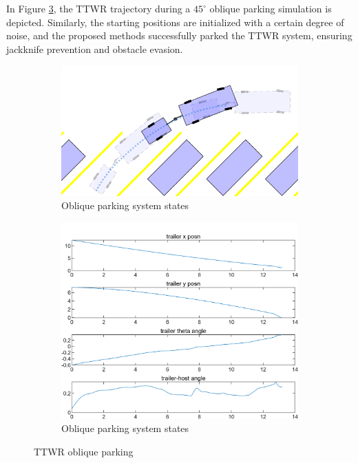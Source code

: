 In Figure \ref{fig:oblique parking}, the TTWR trajectory during a $45^{\circ}$ oblique parking simulation is depicted. Similarly, the starting positions are initialized with a certain degree of noise, and the proposed methods successfully parked the TTWR system, ensuring jackknife prevention and obstacle evasion.

\begin{figure}
     \centering
     \begin{subfigure}[b]{0.4\textwidth}
         \centering
            \includegraphics[width=\textwidth]{fig/ppo/parkingIllustration_oblique.png}
            \caption{Oblique parking system states}
            \label{fig:parking_trajectory_oblique_illustration}
     \end{subfigure}
     \hfill
     \begin{subfigure}[b]{0.4\textwidth}
         \centering
            \includegraphics[width=\textwidth]{fig/ppo/parking_system_states_oblique.png}
            \caption{Oblique parking system states}
            \label{fig:parking_system_states_oblique}
     \end{subfigure}
        \caption{TTWR oblique parking}
        \label{fig:oblique parking}
\end{figure}


